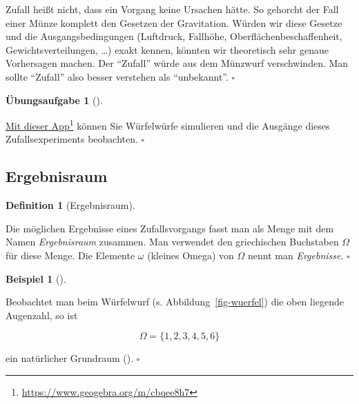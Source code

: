 \documentclass[
  ngerman,
  letterpaper,
  twoside,
  open=any]{scrbook}
\theoremstyle{definition}
\newtheorem{example}{Beispiel}[chapter]
\theoremstyle{plain}
\theoremstyle{definition}
\newtheorem{exercise}{Übungsaufgabe}[chapter]
\theoremstyle{definition}
\newtheorem{definition}{Definition}[chapter]
\theoremstyle{remark}
\begin{document}
\begin{tcolorbox}[enhanced jigsaw, arc=.35mm, bottomrule=.15mm, bottomtitle=1mm, breakable, colback=white, colbacktitle=quarto-callout-caution-color!10!white, colframe=quarto-callout-caution-color-frame, coltitle=black, left=2mm, leftrule=.75mm, opacityback=0, opacitybacktitle=0.6, rightrule=.15mm, title=\textcolor{quarto-callout-caution-color}{\faFire}\hspace{0.5em}{Vorsicht}, titlerule=0mm, toprule=.15mm, toptitle=1mm]

Zufall heißt nicht, dass ein Vorgang keine Ursachen hätte. So gehorcht
der Fall einer Münze komplett den Gesetzen der Gravitation. Würden wir
diese Gesetze und die Ausgangsbedingungen (Luftdruck, Fallhöhe,
Oberflächenbeschaffenheit, Gewichtsverteilungen, \ldots) exakt kennen,
könnten wir theoretisch sehr genaue Vorhersagen machen. Der
\enquote{Zufall} würde aus dem Münzwurf verschwinden. Man sollte
\enquote{Zufall} also besser verstehen als \enquote{unbekannt}.
\(\square\)

\end{tcolorbox}

\begin{exercise}[]\protect\hypertarget{exr-würfel-geo}{}\label{exr-würfel-geo}

\href{https://www.geogebra.org/m/cbqee8h7}{Mit dieser App}\footnote{\url{https://www.geogebra.org/m/cbqee8h7}}
können Sie Würfelwürfe simulieren und die Ausgänge dieses
Zufallsexperiments beobachten. \(\square\)

\end{exercise}

\subsection{Ergebnisraum}\label{ergebnisraum}

\begin{definition}[Ergebnisraum]\protect\hypertarget{def-Ergebnisraum}{}\label{def-Ergebnisraum}

Die möglichen Ergebnisse eines Zufallsvorgangs fasst man als Menge mit
dem Namen \emph{Ergebnisraum} zusammen. Man verwendet den griechischen
Buchstaben \(\Omega\) für diese Menge. Die Elemente \(\omega\) (kleines
Omega) von \(\Omega\) nennt man \emph{Ergebnisse}. \(\square\)

\end{definition}

\begin{example}[]\protect\hypertarget{exm-grundraum}{}\label{exm-grundraum}

Beobachtet man beim Würfelwurf (s. Abbildung~\ref{fig-wuerfel}) die oben
liegende Augenzahl, so ist

\[\Omega = \{ 1,2,3,4,5,6 \}\]

ein natürlicher Grundraum ().
\(\square\)

\end{example}
\end{document}
